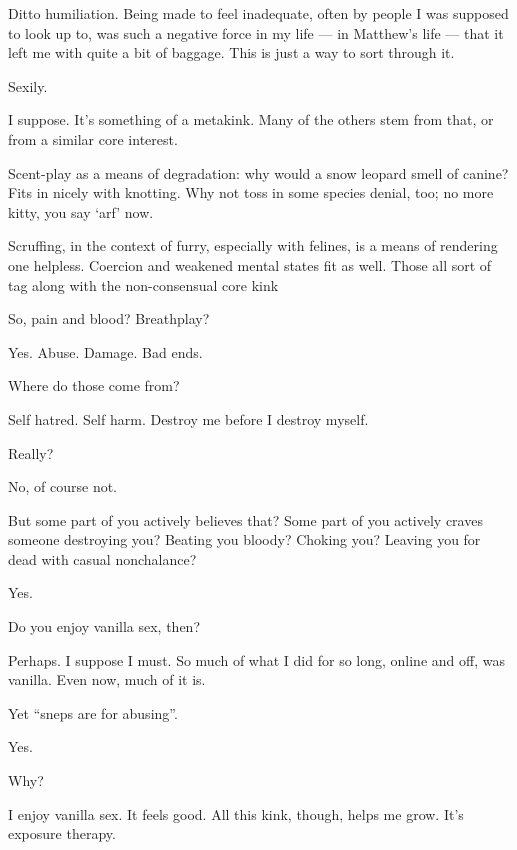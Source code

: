 Ditto humiliation. Being made to feel inadequate, often by people I was supposed to look up to, was such a negative force in my life --- in Matthew's life --- that it left me with quite a bit of baggage. This is just a way to sort through it.

\begin{ally}
Sexily.
\end{ally}
I suppose. It's something of a metakink. Many of the others stem from that, or from a similar core interest.

Scent-play as a means of degradation: why would a snow leopard smell of canine? Fits in nicely with knotting. Why not toss in some species denial, too; no more kitty, you say `arf' now.

Scruffing, in the context of furry, especially with felines, is a means of rendering one helpless. Coercion and weakened mental states fit as well. Those all sort of tag along with the non-consensual core kink

\begin{ally}
So, pain and blood? Breathplay?
\end{ally}
Yes. Abuse. Damage. Bad ends.

\begin{ally}
Where do those come from?
\end{ally}
Self hatred. Self harm. Destroy me before I destroy myself.

\begin{ally}
Really?
\end{ally}
No, of course not.

\begin{ally}
But some part of you actively believes that? Some part of you actively craves someone destroying you? Beating you bloody? Choking you? Leaving you for dead with casual nonchalance?
\end{ally}
Yes.
\newpage

\begin{ally}
Do you enjoy vanilla sex, then?
\end{ally}
Perhaps. I suppose I must. So much of what I did for so long, online and off, was vanilla. Even now, much of it is.

\begin{ally}
Yet ``sneps are for abusing''.
\end{ally}
Yes.

\begin{ally}
Why?
\end{ally}
I enjoy vanilla sex. It feels good. All this kink, though, helps me grow. It's exposure therapy.

